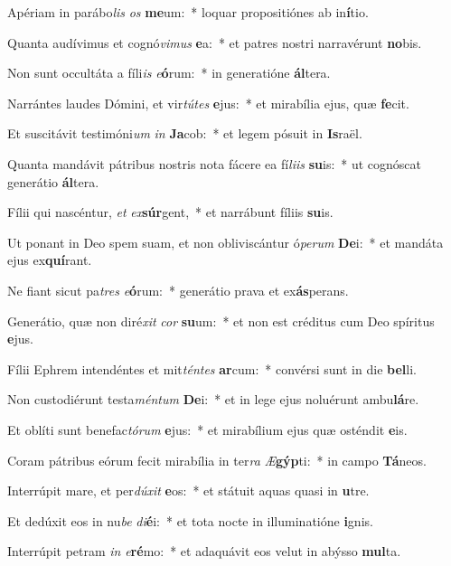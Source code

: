 \item Apériam in parábo\textit{lis} \textit{os} \textbf{me}um:~* loquar propositiónes ab in\textbf{í}tio.
\item Quanta audívimus et cognó\textit{vi}\textit{mus} \textbf{e}a:~* et patres nostri narravérunt \textbf{no}bis.
\item Non sunt occultáta a fíli\textit{is} \textit{e}\textbf{ó}rum:~* in generatióne \textbf{ál}tera.
\item Narrántes laudes Dómini, et vir\textit{tú}\textit{tes} \textbf{e}jus:~* et mirabília ejus, quæ \textbf{fe}cit.
\item Et suscitávit testimóni\textit{um} \textit{in} \textbf{Ja}cob:~* et legem pósuit in \textbf{Is}raël.
\item Quanta mandávit pátribus nostris nota fácere ea fí\textit{li}\textit{is} \textbf{su}is:~* ut cognóscat generátio \textbf{ál}tera.
\item Fílii qui nascéntur, \textit{et} \textit{ex}\textbf{súr}gent,~* et narrábunt fíliis \textbf{su}is.
\item Ut ponant in Deo spem suam, et non obliviscántur ó\textit{pe}\textit{rum} \textbf{De}i:~* et mandáta ejus ex\textbf{quí}rant.
\item Ne fiant sicut pa\textit{tres} \textit{e}\textbf{ó}rum:~* generátio prava et ex\textbf{ás}perans.
\item Generátio, quæ non diré\textit{xit} \textit{cor} \textbf{su}um:~* et non est créditus cum Deo spíritus \textbf{e}jus.
\item Fílii Ephrem intendéntes et mit\textit{tén}\textit{tes} \textbf{ar}cum:~* convérsi sunt in die \textbf{bel}li.
\item Non custodiérunt testa\textit{mén}\textit{tum} \textbf{De}i:~* et in lege ejus noluérunt ambu\textbf{lá}re.
\item Et oblíti sunt benefac\textit{tó}\textit{rum} \textbf{e}jus:~* et mirabílium ejus quæ osténdit \textbf{e}is.
\item Coram pátribus eórum fecit mirabília in ter\textit{ra} \textit{Æ}\textbf{gýp}ti:~* in campo \textbf{Tá}neos.
\item Interrúpit mare, et per\textit{dú}\textit{xit} \textbf{e}os:~* et státuit aquas quasi in \textbf{u}tre.
\item Et dedúxit eos in nu\textit{be} \textit{di}\textbf{é}i:~* et tota nocte in illuminatióne \textbf{i}gnis.
\item Interrúpit petram \textit{in} \textit{e}\textbf{ré}mo:~* et adaquávit eos velut in abýsso \textbf{mul}ta.
